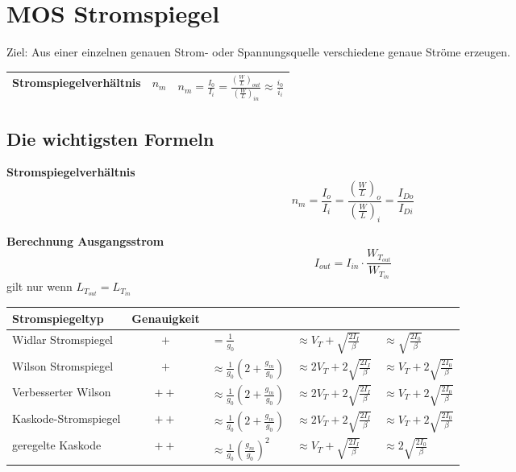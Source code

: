 \section{MOS Stromspiegel}
Ziel: Aus einer einzelnen genauen Strom- oder Spannungsquelle verschiedene genaue Ströme erzeugen.

\begin{tabularx}{\linewidth}{|l|l|X|}
	\hline
	Stromspiegelverhältnis & $n_m$ & $n_m = \frac{I_0}{I_i} = \frac{(\frac{W}{L})_{out}}{(\frac{W}{L})_{in}} \approx \frac{i_0}{i_i}$
	\\ \hline
\end{tabularx}

\subsection{Die wichtigsten Formeln}
\begin{multicols}{2}
	\textbf{Stromspiegelverhältnis}
	\[
		n_m = \frac{I_o}{I_i} 
			= \frac{\left(\frac{W}{L}\right)_o}{\left(\frac{W}{L}\right)_i}
			= \frac{I_{Do}}{I_{Di}}
	\]
	\columnbreak
		
	\textbf{Berechnung Ausgangsstrom}
	\[
		I_{out} = I_{in}\cdot\frac{W_{T_{out}}}{W_{T_{in}}}
	\]
	gilt nur wenn $L_{T_{out}} = L_{T_{in}}$
\end{multicols}


\begin{tabular}{|l|c|l|l|l|}
	\hline
	\textbf{Stromspiegeltyp} & \textbf{Genauigkeit} & \boldmath{$r_{out}$} & \boldmath{$V_I$} & \boldmath{$V_{O,min}$}
	\\ \hline
	Widlar Stromspiegel		& $+$	& $= \frac{1}{g_0}$								& $\approx V_T + \sqrt{\frac{2I_I}{\beta}}$		& $\approx \sqrt{\frac{2I_0}{\beta}}$
	\\ \hline
	Wilson Stromspiegel		& $+$	& $\approx \frac{1}{g_0}(2 + \frac{g_m}{g_0})$	& $\approx 2V_T + 2\sqrt{\frac{2I_I}{\beta}}$	& $\approx V_T + 2\sqrt{\frac{2I_0}{\beta}}$
	\\ \hline
	Verbesserter Wilson		& $++$	& $\approx \frac{1}{g_0}(2 + \frac{g_m}{g_0})$	& $\approx 2V_T + 2\sqrt{\frac{2I_I}{\beta}}$	& $\approx V_T + 2\sqrt{\frac{2I_0}{\beta}}$
	\\ \hline
	Kaskode-Stromspiegel	& $++$	& $\approx \frac{1}{g_0}(2 + \frac{g_m}{g_0})$	& $\approx 2V_T + 2\sqrt{\frac{2I_I}{\beta}}$	& $\approx V_T + 2\sqrt{\frac{2I_0}{\beta}}$
	\\ \hline
	geregelte Kaskode		& $++$	& $\approx \frac{1}{g_0}(\frac{g_m}{g_0})^2$	& $\approx V_T + \sqrt{\frac{2I_I}{\beta}}$		& $\approx 2\sqrt{\frac{2I_0}{\beta}}$
	\\ \hline
\end{tabular}

